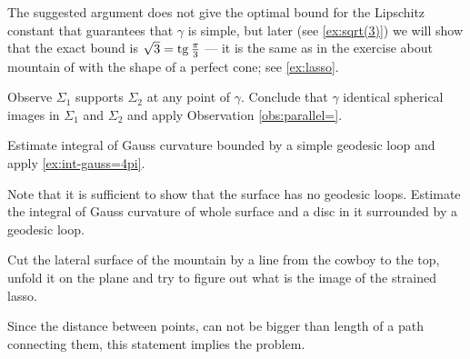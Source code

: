 The suggested argument does not give the optimal bound for the Lipschitz constant that guarantees that $\gamma$ is simple, but
later (see \ref{ex:sqrt(3)}) we will show that the exact bound is $\sqrt{3}=\operatorname{tg}\tfrac\pi3$ --- it is the same as in the exercise about mountain of with the shape of a perfect cone; see \ref{ex:lasso}.


Observe $\Sigma_1$ supports $\Sigma_2$ at any point of $\gamma$.
Conclude that $\gamma$ identical spherical images in $\Sigma_1$ and $\Sigma_2$ and apply Observation \ref{obs:parallel=}.





 Estimate integral of Gauss curvature bounded by a simple geodesic loop and apply \ref{ex:int-gauss=4pi}.


 Note that it is sufficient to show that the surface has no geodesic loops.
Estimate the integral of Gauss curvature of whole surface and a disc in it surrounded by a geodesic loop.


 Cut the lateral surface of the mountain by a line from the cowboy to the top, unfold it on the plane and try to figure out what is the image of the strained lasso.

Since the distance between points, can not be bigger than length of a path connecting them,
this statement implies the problem.











